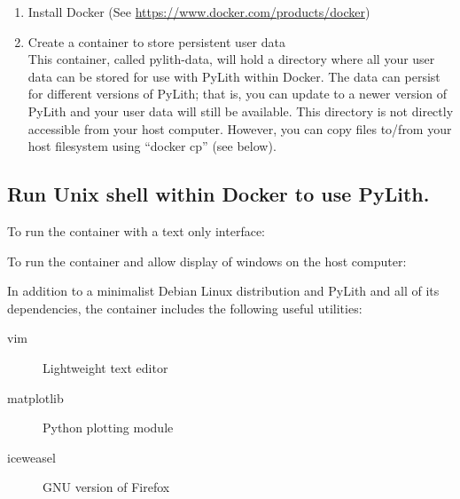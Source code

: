\begin{enumerate}
\item Install Docker (See \url{https://www.docker.com/products/docker})
\item Create a container to store persistent user data\\
  This container, called pylith-data, will hold a directory where all
  your user data can be stored for use with PyLith within Docker. The
  data can persist for different versions of PyLith; that is, you can
  update to a newer version of PyLith and your user data will still
  be available. This directory is not directly accessible from your
  host computer. However, you can copy files to/from your host filesystem
  using ``docker cp'' (see below).
\end{enumerate}

\subsection{Run Unix shell within Docker to use PyLith.}

To run the container with a text only interface:

To run the container and allow display of windows on the host computer:

In addition to a minimalist Debian Linux distribution and PyLith and
all of its dependencies, the container includes the following useful
utilities:
\begin{description}
\item[vim] Lightweight text editor
\item[matplotlib] Python plotting module
\item[iceweasel] GNU version of Firefox
\end{description}


